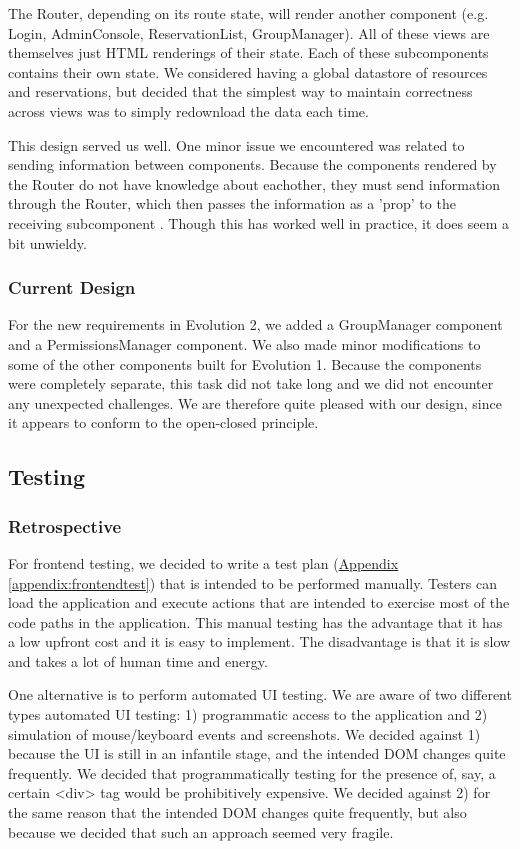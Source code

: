 \documentclass[12pt]{article}
\begin{document}
The Router, depending on its route state, will render another component (e.g. Login, AdminConsole, ReservationList, GroupManager). All of these views are themselves just HTML renderings of their state. Each of these subcomponents contains their own state. We considered having a global datastore of resources and reservations, but decided that the simplest way to maintain correctness across views was to simply redownload the data each time.

This design served us well. One minor issue we encountered was related to sending information between components. Because the components rendered by the Router do not have knowledge about eachother, they must send information through the Router, which then passes the information as a 'prop' to the receiving subcomponent . Though this has worked well in practice, it does seem a bit unwieldy.

\subsubsection{Current Design}
For the new requirements in Evolution 2, we added a GroupManager component and a PermissionsManager component. We also made minor modifications to some of the other components built for Evolution 1. Because the components were completely separate, this task did not take long and we did not encounter any unexpected challenges. We are therefore quite pleased with our design, since it appears to conform to the open-closed principle.

\subsection{Testing}
\subsubsection{Retrospective}
For frontend testing, we decided to write a test plan (\hyperref[appendix:frontendtest]{Appendix \ref{appendix:frontendtest}}) that is intended to be performed manually. Testers can load the application and execute actions that are intended to exercise most of the code paths in the application. This manual testing has the advantage that it has a low upfront cost and it is easy to implement. The disadvantage is that it is slow and takes a lot of human time and energy.

One alternative is to perform automated UI testing. We are aware of two different types automated UI testing: 1) programmatic access to the application and 2) simulation of mouse/keyboard events and screenshots. We decided against 1) because the UI is still in an infantile stage, and the intended DOM changes quite frequently. We decided that programmatically testing for the presence of, say, a certain <div> tag would be prohibitively expensive. We decided against 2) for the same reason that the intended DOM changes quite frequently, but also because we decided that such an approach seemed very fragile.
\end{document}
